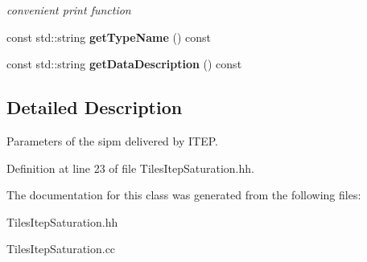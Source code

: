 \begin{DoxyCompactItemize}
\begin{DoxyCompactList}\small\item\em convenient print function \end{DoxyCompactList}\item 
const std\-::string {\bfseries get\-Type\-Name} () const \label{classCALICE_1_1TilesItepSaturation_a3e451bde21fa2a6341f2a419015db1a6}

\item 
const std\-::string {\bfseries get\-Data\-Description} () const \label{classCALICE_1_1TilesItepSaturation_a488b198fa1cb769b3023669cf23a1200}

\end{DoxyCompactItemize}


\subsection{Detailed Description}
Parameters of the sipm delivered by I\-T\-E\-P. 

Definition at line 23 of file Tiles\-Itep\-Saturation.\-hh.



The documentation for this class was generated from the following files\-:\begin{DoxyCompactItemize}
\item 
Tiles\-Itep\-Saturation.\-hh\item 
Tiles\-Itep\-Saturation.\-cc\end{DoxyCompactItemize}
